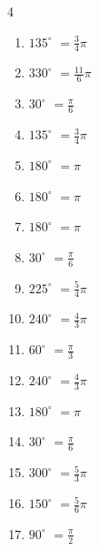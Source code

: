 \begin{multicols}{4}
\begin{enumerate}
  \item $\displaystyle 135^{\circ}$
        $\displaystyle =\frac{3}{4}\pi$

  \item $\displaystyle 330^{\circ}$
        $\displaystyle =\frac{11}{6}\pi$

  \item $\displaystyle 30^{\circ}$
        $\displaystyle =\frac{\pi}{6}$

  \item $\displaystyle 135^{\circ}$
        $\displaystyle =\frac{3}{4}\pi$

  \item $\displaystyle 180^{\circ}$
        $\displaystyle =\pi$

  \item $\displaystyle 180^{\circ}$
        $\displaystyle =\pi$

\columnbreak %

  \item $\displaystyle 180^{\circ}$
        $\displaystyle =\pi$

  \item $\displaystyle 30^{\circ}$
        $\displaystyle =\frac{\pi}{6}$

  \item $\displaystyle 225^{\circ}$
        $\displaystyle =\frac{5}{4}\pi$

  \item $\displaystyle 240^{\circ}$
        $\displaystyle =\frac{4}{3}\pi$

  \item $\displaystyle 60^{\circ}$
        $\displaystyle =\frac{\pi}{3}$

  \item $\displaystyle 240^{\circ}$
        $\displaystyle =\frac{4}{3}\pi$

  \item $\displaystyle 180^{\circ}$
        $\displaystyle =\pi$

  \item $\displaystyle 30^{\circ}$
        $\displaystyle =\frac{\pi}{6}$

  \item $\displaystyle 300^{\circ}$
        $\displaystyle =\frac{5}{3}\pi$

  \item $\displaystyle 150^{\circ}$
        $\displaystyle =\frac{5}{6}\pi$

  \item $\displaystyle 90^{\circ}$
        $\displaystyle =\frac{\pi}{2}$


\end{enumerate}
\end{multicols}
